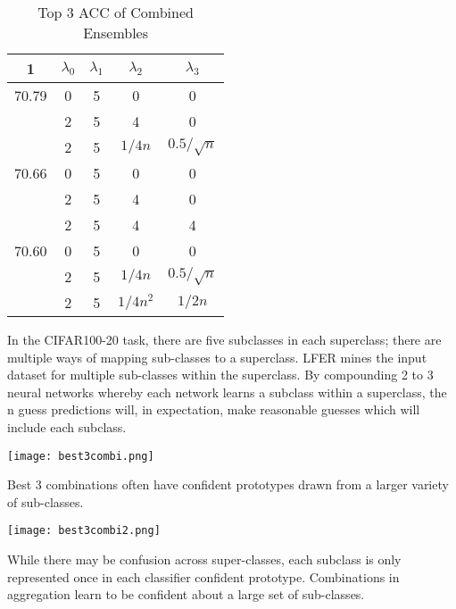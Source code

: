 \documentclass[journal]{journal}
\begin{document}
\begin{table}[h]

\begin{center}
\begin{tabular}{|c|c|c|c|c|}
    \hline 
     \multirow{ 4}{*}{1} Top 3 ACC & $\lambda_{0}$ & $\lambda_{1}$ & $\lambda_{2}$ & $\lambda_{3}$ \\
     \hline
      70.79  & 0 & 5 & 0 & 0 \\
    & 2 & 5 & 4 & 0\\
    & 2 & 5 & $1/4n$ & $0.5/\sqrt{n}$ \\
    \hline
     70.66 & 0 & 5 & 0 & 0 \\
    & 2 & 5 & 4& 0 \\
    &2 & 5 & 4 & 4 \\
    \hline
     70.60 & 0 & 5 & 0 & 0 \\
    & 2 & 5 & $1/4n$ & $0.5/\sqrt{n}$ \\
     & 2 & 5 & $1 /4n^2$ & $1/2n$ \\ \hline
\end{tabular}
\end{center}
\caption{Top 3 ACC of Combined Ensembles}
\label{tab:multicol}
\end{table}

In the CIFAR100-20 task, there are five subclasses in each superclass; there are multiple ways of mapping sub-classes to a superclass. LFER mines the input dataset for multiple sub-classes within the superclass. By compounding  2 to 3 neural networks whereby each network learns a subclass within a superclass, the n guess predictions will, in expectation, make reasonable guesses which will include each subclass. 

\begin{minipage}{\linewidth}
\texttt{[image: best3combi.png]}
\end{minipage}

Best 3 combinations often have confident prototypes drawn from a larger variety of sub-classes. 
\begin{minipage}{\linewidth}
\texttt{[image: best3combi2.png]}
\end{minipage}
While there may be confusion across super-classes, each subclass is only represented once in each classifier confident prototype. Combinations in aggregation learn to be confident about a large set of sub-classes.  
\end{document}
